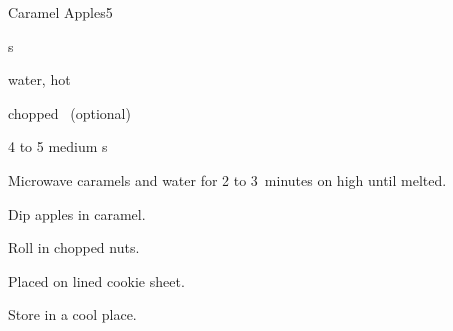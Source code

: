 \begin{recipe}{Caramel Apples}{}{5}

\begin{ingredients}
\item {} s
\item {} water, hot
\item chopped ~(optional)
\item 4 to 5 medium s
\end{ingredients}

\begin{directions}
\item Microwave caramels and water for 2 to 3~minutes on high until melted.
\item Dip apples in caramel.
\item Roll in chopped nuts.
\item Placed on lined cookie sheet.
\item Store in a cool place.
\end{directions}

\end{recipe}
